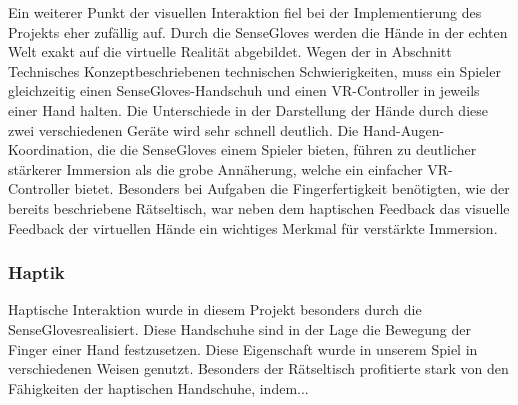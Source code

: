 Ein weiterer Punkt der visuellen Interaktion fiel bei der Implementierung des Projekts eher zufällig auf. Durch die SenseGloves werden die Hände in der echten Welt exakt auf die virtuelle Realität abgebildet. Wegen der in Abschnitt \dq Technisches Konzept\dq beschriebenen technischen Schwierigkeiten, muss ein Spieler gleichzeitig einen SenseGloves-Handschuh und einen VR-Controller in jeweils einer Hand halten. Die Unterschiede in der Darstellung der Hände durch diese zwei verschiedenen Geräte wird sehr schnell deutlich. Die Hand-Augen-Koordination, die die SenseGloves einem Spieler bieten, führen zu deutlicher stärkerer Immersion als die grobe Annäherung, welche ein einfacher VR-Controller bietet. Besonders bei Aufgaben die Fingerfertigkeit benötigten, wie der bereits beschriebene Rätseltisch, war neben dem haptischen Feedback das visuelle Feedback der virtuellen Hände ein wichtiges Merkmal für verstärkte Immersion.
\subsubsection{Haptik}
Haptische Interaktion wurde in diesem Projekt besonders durch die \dq SenseGloves\dq realisiert. Diese Handschuhe sind in der Lage die Bewegung der Finger einer Hand festzusetzen. Diese Eigenschaft wurde in unserem Spiel in verschiedenen Weisen genutzt. Besonders der Rätseltisch profitierte stark von den Fähigkeiten der haptischen Handschuhe, indem...\\
